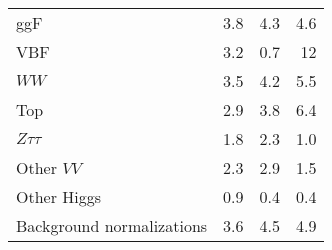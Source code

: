 \begin{tabular}{lrrr}
    \hspace*{4mm} ggF                   & 3.8                                                                                                                          & 4.3                                                                                                                  & 4.6\tabularnewline
    \hspace*{4mm} VBF                   & 3.2                                                                                                                          & 0.7                                                                                                                  & 12\phantom{.0}\tabularnewline
    \hspace*{4mm} $WW$                  & 3.5                                                                                                                          & 4.2                                                                                                                  & 5.5\tabularnewline
    \hspace*{4mm} Top                   & 2.9                                                                                                                          & 3.8                                                                                                                  & 6.4\tabularnewline
    \hspace*{4mm} $Z\tau\tau$           & 1.8                                                                                                                          & 2.3                                                                                                                  & 1.0\tabularnewline
    \hspace*{4mm} Other $VV$            & 2.3                                                                                                                          & 2.9                                                                                                                  & 1.5\tabularnewline
    \hspace*{4mm} Other Higgs           & 0.9                                                                                                                          & 0.4                                                                                                                  & 0.4\tabularnewline
    Background normalizations           & 3.6                                                                                                                          & 4.5                                                                                                                  & 4.9\tabularnewline

\end{tabular}
